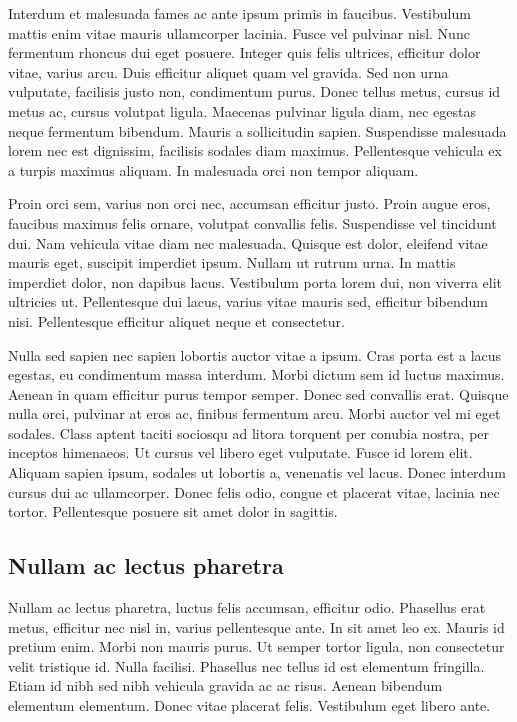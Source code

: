 Interdum et malesuada fames ac ante ipsum primis in faucibus.
Vestibulum mattis enim vitae mauris ullamcorper lacinia.
Fusce vel pulvinar nisl.
Nunc fermentum rhoncus dui eget posuere.
Integer quis felis ultrices, efficitur dolor vitae, varius arcu.
Duis efficitur aliquet quam vel gravida.
Sed non urna vulputate, facilisis justo non, condimentum purus.
Donec tellus metus, cursus id metus ac, cursus volutpat ligula.
Maecenas pulvinar ligula diam, nec egestas neque fermentum bibendum.
Mauris a sollicitudin sapien.
Suspendisse malesuada lorem nec est dignissim, facilisis sodales diam maximus.
Pellentesque vehicula ex a turpis maximus aliquam.
In malesuada orci non tempor aliquam.

Proin orci sem, varius non orci nec, accumsan efficitur justo.
Proin augue eros, faucibus maximus felis ornare, volutpat convallis felis.
Suspendisse vel tincidunt dui.
Nam vehicula vitae diam nec malesuada.
Quisque est dolor, eleifend vitae mauris eget, suscipit imperdiet ipsum.
Nullam ut rutrum urna.
In mattis imperdiet dolor, non dapibus lacus.
Vestibulum porta lorem dui, non viverra elit ultricies ut.
Pellentesque dui lacus, varius vitae mauris sed, efficitur bibendum nisi.
Pellentesque efficitur aliquet neque et consectetur.

Nulla sed sapien nec sapien lobortis auctor vitae a ipsum.
Cras porta est a lacus egestas, eu condimentum massa interdum.
Morbi dictum sem id luctus maximus.
Aenean in quam efficitur purus tempor semper.
Donec sed convallis erat.
Quisque nulla orci, pulvinar at eros ac, finibus fermentum arcu.
Morbi auctor vel mi eget sodales.
Class aptent taciti sociosqu ad litora torquent per conubia nostra, per inceptos himenaeos.
Ut cursus vel libero eget vulputate.
Fusce id lorem elit.
Aliquam sapien ipsum, sodales ut lobortis a, venenatis vel lacus.
Donec interdum cursus dui ac ullamcorper.
Donec felis odio, congue et placerat vitae, lacinia nec tortor.
Pellentesque posuere sit amet dolor in sagittis.

\subsection{Nullam ac lectus pharetra}

Nullam ac lectus pharetra, luctus felis accumsan, efficitur odio.
Phasellus erat metus, efficitur nec nisl in, varius pellentesque ante.
In sit amet leo ex.
Mauris id pretium enim.
Morbi non mauris purus.
Ut semper tortor ligula, non consectetur velit tristique id.
Nulla facilisi.
Phasellus nec tellus id est elementum fringilla.
Etiam id nibh sed nibh vehicula gravida ac ac risus.
Aenean bibendum elementum elementum.
Donec vitae placerat felis.
Vestibulum eget libero ante.

